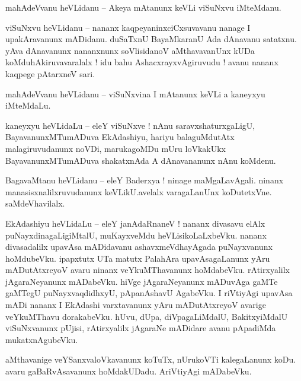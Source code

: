 \documentclass{article}
\begin{document}
\begin{mn}%
mahAdeVvanu heVLidanu -- Akeya mAtanunx keVLi viSuNxvu iMteMdanu.
\end{mn}

\begin{mn}%
viSuNxvu heVLidanu -- nananx kaqpeyaninxciCxsuvavanu nanage I upakAravanunx mADidanu. duSaTxnU 
BayaMkaranU Ada dAnavanu satatxnu. yAva dAnavanunx nananxnunx soVlisidanoV aMthavavanUnx kUDa 
koMduhAkiruvavaralalx ! idu bahu AshacxrayxvAgiruvudu ! avanu nananx kaqpege pAtarxneV sari.
\end{mn}

\begin{mn}%
mahAdeVvanu heVLidanu -- viSuNxvina I mAtanunx keVLi a kaneyxyu iMteMdaLu.
\end{mn}

\begin{mn}%
kaneyxyu heVLidaLu -- eleY viSuNxve ! nAnu saravxshaturxgaLigU, BayavanunxMTumADuva EkAdashiyu, 
hariyu balaguMdutAtx malagiruvudanunx noVDi, marukagoMDu mUru loVkakUkx BayavanunxMTumADuva 
shakatxnAda A dAnavananunx nAnu koMdenu.
\end{mn}

\begin{mn}%
BagavaMtanu heVLidanu -- eleY Baderxya ! ninage maMgaLavAgali. ninanx manasisxnalilxruvudanunx 
keVLikU.avelalx varagaLanUnx koDutetxVne. saMdeVhavilalx.
\end{mn}

\begin{mn}%
EkAdashiyu heVLidaLu -- eleY janAdaRnaneV ! nananx divasavu elAlx puNayxdinagaLigiMtalU, 
muKayxveMdu heVLisikoLaLxbeVku. nananx divasadalilx upavAsa mADidavanu ashavxmeVdhayAgada 
puNayxvanunx hoMdubeVku. ipapxtutx UTa matutx PalahAra upavAsagaLanunx yAru mADutAtxreyoV avaru 
ninanx veYkuMThavanunx hoMdabeVku. rAtirxyalilx jAgaraNeyanunx mADabeVku. hiVge jAgaraNeyanunx 
mADuvAga gaMTe gaMTegU puNayxvaqdidhxyU, pApanAshavU AgabeVku. I riVtiyAgi upavAsa mADi nananx I 
EkAdashi varxtavanunx yAru mADutAtxreyoV avarige veYkuMThavu dorakabeVku. hUvu, dUpa, 
diVpagaLiMdalU, BakitxyiMdalU viSuNxvanunx pUjisi, rAtirxyalilx jAgaraNe mADidare avanu pApadiMda 
mukatxnAgubeVku.
\end{mn}

\begin{mn}%
aMthavanige veYSanxvaloVkavanunx koTuTx, nUrukoVTi kalegaLanunx koDu. avaru gaBaRvAsavanunx 
hoMdakUDadu. AriVtiyAgi mADabeVku.
\end{mn}
\end{document}
